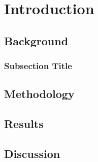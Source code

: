 \chapter{Introduction}\label{ch:introduction}
\lipsum[1-2] %

\section{Background}
\lipsum[3-4] %
\cite{bornholdt}

\subsection{Subsection Title}
\lipsum[5] %

\section{Methodology}
\lipsum[6-7] %

\section{Results}
\lipsum[8-9] %

\section{Discussion}
\lipsum[10] %